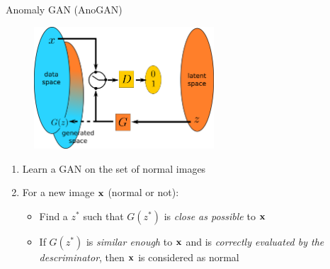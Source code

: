 \documentclass[xcolor=pdftex,dvipsnames,table,mathserif]{beamer}
\begin{document}


\begin{frame}{Anomaly GAN (AnoGAN)~\tiny{\cite{schlegl_unsupervised_2017}}}

  \begin{figure}[ht]
    \centering
    \includegraphics[width=0.6\textwidth]{gan2}
  \end{figure}

  \begin{enumerate}
  \item Learn a GAN on the set of normal images
  \item For a new image $\mathbf{x}$ (normal or not):
    \begin{itemize}
    \item Find a $z^*$ such that $G(z^*)$ is \emph{close as possible} to $\mathbf{x}$
    \item If $G(z^*)$ is \emph{similar enough} to $\mathbf{x}$ and is \emph{correctly evaluated by the descriminator}, then $\mathbf{x}$ is considered as normal
    \end{itemize}
  \end{enumerate}

\end{frame}
\end{document}
